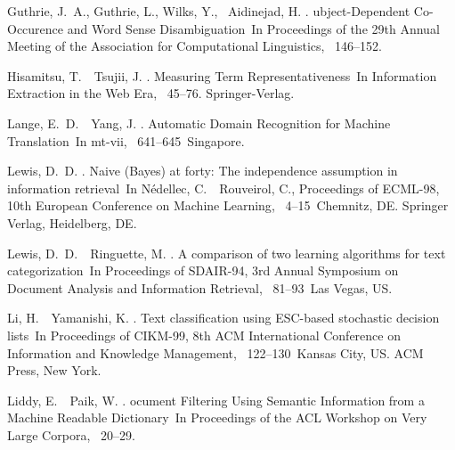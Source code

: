 \documentclass[japanese]{jnlp_1.4}
\begin{document}
\begin{thebibliography}{}
Guthrie, J.~A., Guthrie, L., Wilks, Y., \BBA\ Aidinejad, H. \BBCP.
\newblock {}ubject-{D}ependent {C}o-{O}ccurence and {W}ord {S}ense
  {D}isambiguation\BBCQ\
\newblock In {\Bem Proceedings of the 29th Annual Meeting of the Association
  for Computational Linguistics}, \mbox{\BPGS\ 146--152}.

Hisamitsu, T.\BBACOMMA\ \BBA\ Tsujii, J. \BBOP 2003\BBCP.
\newblock \BBOQ Measuring {T}erm {R}epresentativeness\BBCQ\
\newblock In {\Bem Information Extraction in the Web Era}, \mbox{\BPGS\
  45--76}. Springer-Verlag.

Lange, E.~D.\BBACOMMA\ \BBA\ Yang, J. \BBOP 1999\BBCP.
\newblock \BBOQ Automatic Domain Recognition for Machine Translation\BBCQ\
\newblock In {\Bem mt-vii}, \mbox{\BPGS\ 641--645}\ Singapore.

Lewis, D.~D. \BBOP 1998\BBCP.
\newblock \BBOQ Naive ({B}ayes) at forty: The independence assumption in
      information retrieval\BBCQ\
\newblock In N{\'{e}}dellec, C.\BBACOMMA\ \BBA\ Rouveirol, C.\BEDS, {\Bem
  Proceedings of {ECML}-98, 10th European Conference on Machine Learning},
  \mbox{\BPGS\ 4--15}\ Chemnitz, DE. Springer Verlag, Heidelberg, DE.

Lewis, D.~D.\BBACOMMA\ \BBA\ Ringuette, M. \BBOP 1994\BBCP.
\newblock \BBOQ A comparison of two learning algorithms for text
  categorization\BBCQ\
\newblock In {\Bem Proceedings of {SDAIR}-94, 3rd Annual Symposium on Document
  Analysis and Information Retrieval}, \mbox{\BPGS\ 81--93}\ Las Vegas, US.

Li, H.\BBACOMMA\ \BBA\ Yamanishi, K. \BBOP 1999\BBCP.
\newblock \BBOQ Text classification using {ESC}-based stochastic decision
  lists\BBCQ\
\newblock In {\Bem Proceedings of {CIKM}-99, 8th {ACM} International Conference
  on Information and Knowledge Management}, \mbox{\BPGS\ 122--130}\ Kansas
  City, US. ACM Press, New York.

Liddy, E.\BBACOMMA\ \BBA\ Paik, W. \BBCP.
\newblock \BBOQ {D}ocument {F}iltering {U}sing {S}emantic {I}nformation from a
  {M}achine {R}eadable {D}ictionary\BBCQ\
\newblock In {\Bem Proceedings of the ACL Workshop on Very Large Corpora},
  \mbox{\BPGS\ 20--29}.


\end{thebibliography}
\end{document}
